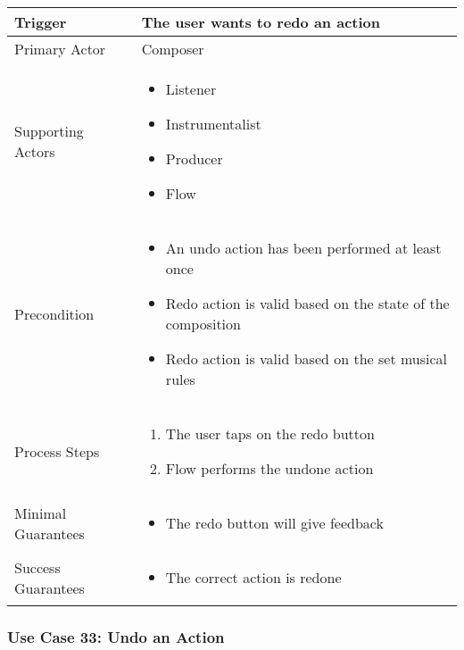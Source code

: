   \begin{tabularx}{\textwidth}{|X|X|}
  \hline
  Trigger & 
  The user wants to redo an action\\
  \hline
  Primary Actor & 
  Composer \\
  \hline
  Supporting Actors & 
  \begin{itemize}
  \item Listener
  \item Instrumentalist
  \item Producer
  \item Flow
  \end{itemize} \\
  \hline
  Precondition & 
  \begin{itemize}
  \item An undo action has been performed at least once
  \item Redo action is valid based on the state of the composition
  \item Redo action is valid based on the set musical rules
  \end{itemize} \\
  \hline
  Process Steps & 
  \begin{enumerate}
  \item The user taps on the redo button
  \item Flow performs the undone action
  \end{enumerate} \\
  \hline
  Minimal Guarantees & 
  \begin{itemize}
    \item The redo button will give feedback 
  \end{itemize}\\
  \hline
  Success Guarantees & 
  \begin{itemize}
    \item The correct action is redone
  \end{itemize} \\
  \hline
  \end{tabularx}

  \subsubsection{Use Case 33: Undo an Action}

